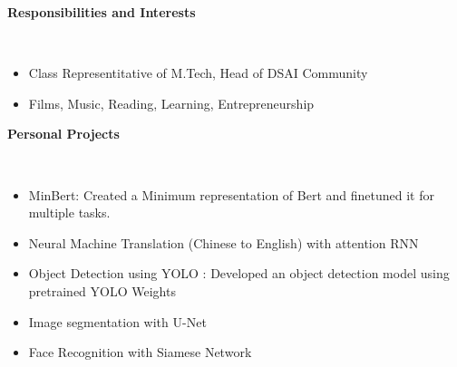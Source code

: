 \documentclass[a4paper,10pt]{article}
\newcommand{\lsep}{-0.5cm}
\newcommand{\resheading}[1]{{\small \colorbox{mygrey}{\begin{minipage}{0.975\textwidth}{\textbf{#1 \vphantom{p\^{E}}}}\end{minipage}}}}
\begin{document}
\resheading{\textbf{Responsibilities and Interests} }\\[\lsep]
\begin{itemize}
\item Class Representitative of M.Tech, Head of DSAI Community
\item Films, Music, Reading, Learning, Entrepreneurship
\end{itemize}

\resheading{\textbf{Personal Projects} }\\[\lsep]
\begin{itemize}
\setlength\itemsep{0.2em}
\item MinBert: Created a Minimum representation of Bert and finetuned it for multiple tasks. %
\item Neural Machine Translation (Chinese to English) with attention RNN%

\item Object Detection using YOLO : Developed an object detection model using pretrained YOLO Weights
\item Image segmentation with U-Net 
\item Face Recognition with Siamese Network

\end{itemize}
\end{document}
